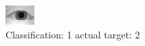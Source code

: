 \begin{figure}[h!]
\begin{center}
\includegraphics[width=0.60\columnwidth]{figures/ID890_class_1_target_2.png}
\end{center}
\caption{ Classification: 1 actual target: 2}
\label{fig:ID890_class_1_target_2}
\end{figure}
